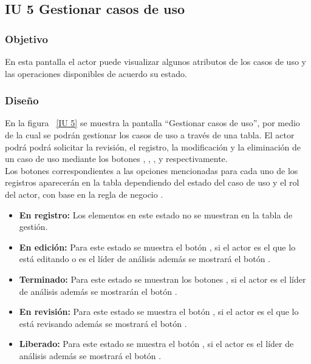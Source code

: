 \subsection{IU 5 Gestionar casos de uso}
\subsubsection{Objetivo}
	
	En esta pantalla el actor puede visualizar algunos atributos de los casos de uso y las operaciones disponibles de acuerdo su estado.

\subsubsection{Diseño}

    En la figura ~\ref{IU 5} se muestra la pantalla ``Gestionar casos de uso'', por medio de la cual 
    se podrán gestionar los casos de uso a través de una tabla.
    El actor podrá podrá solicitar la revisión, el registro, la modificación y la eliminación de un caso de uso mediante los botones
    \btnRevisar, , \btnConsulta, \btnEditar y \btnEliminar respectivamente. \\
    
    Los botones correspondientes a las opciones mencionadas para cada uno de los registros aparecerán en la tabla dependiendo del estado
    del caso de uso y el rol del actor, con base en la regla de negocio .
    	
    \begin{itemize}
	    \item {\bf En registro:} Los elementos en este estado no se muestran en la tabla de gestión.
	    \item {\bf En edición:} Para este estado se muestra el botón \btnConsulta, si el actor es el que lo está editando o es el líder de análisis además se mostrará el botón \btnEditar.
            \item {\bf Terminado:} Para este estado se muestran los botones \btnConsulta \btnRevisar \btnEliminar, si el actor es el líder de análisis además se mostrarán el botón \btnEditar.
            \item {\bf En revisión:} Para este estado se muestra el botón \btnConsulta, si el actor es el que lo está revisando además se mostrará el botón \btnRevisar.
            \item {\bf Liberado:} Para este estado se muestra el botón \btnConsulta, si el actor es el líder de análisis además se mostrará el botón \btnEditar.
    \end{itemize}


